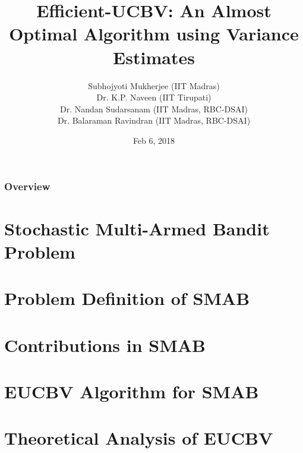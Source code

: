 \documentclass{beamer}
\title[Efficient-UCBV: An Almost Optimal Algorithm using Variance Estimates]{Efficient-UCBV: An Almost Optimal Algorithm using Variance Estimates} %
\author{Subhojyoti Mukherjee (IIT Madras) \\Dr. K.P. Naveen (IIT Tirupati) \\ Dr. Nandan Sudarsanam (IIT Madras, RBC-DSAI)\\ Dr. Balaraman Ravindran (IIT Madras, RBC-DSAI)} %
\institute[IIT Madras] %
{
AAAI 2018, New Orleans, Louisiana, USA \\ %
\medskip
}
\date{Feb 6, 2018}
\begin{document}
\nocite{*}
\begin{frame}
\titlepage %
\end{frame}

\begin{frame}
\frametitle{Overview} %
\tableofcontents %
\end{frame}



%

\section{Stochastic Multi-Armed Bandit Problem}


\section{Problem Definition of SMAB}


\section{Contributions in SMAB}


\section{EUCBV Algorithm for SMAB}


\section{Theoretical Analysis of EUCBV}

\end{document}
